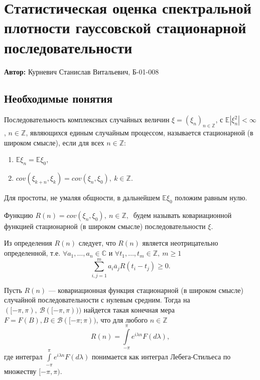 
					
\section{Статистическая оценка спектральной плотности гауссовской стационарной последовательности}

\textbf{Автор:} Курневич Станислав Витальевич, Б-01-008

\subsection*{Необходимые понятия}

\begin{definition}
	Последовательность комплексных случайных величин $\xi = (\xi_n)_{n \in \mathbb{Z}}$, с $\mathbb{E}|\xi_n^2| < \infty$, $n \in \mathbb{Z}$, являющихся единым случайным процессом, называется стационарной (в широком смысле), если для всех $n \in \mathbb{Z}$:
	\begin{enumerate}
		\item $\mathbb{E}  \xi_n = \mathbb{E} \xi_0,$
		\item $cov(\xi_{k+n}, \xi_k) = cov(\xi_n, \xi_0),~ k \in \mathbb{Z}.$
	\end{enumerate}
\end{definition}

Для простоты, не умаляя общности, в дальнейшем $\mathbb{E} \xi_0$ положим равным нулю.

\begin{definition}
	Функцию $R(n) = cov(\xi_n, \xi_0),~ n \in \mathbb{Z},~$ будем называть ковариационной функцией стационарной (в широком смысле) последовательности $\xi$.
\end{definition}

\begin{remark}
	Из определения $R(n)$ следует, что $R(n)$ является неотрицательно определенной, т.е. $\forall a_1, \dots, a_n \in \mathbb{C}$ и $\forall t_1, \dots, t_m \in \mathbb{Z},~ m \geq 1$
	\[\sum\limits_{i,j = 1}^{m}{a_i \overline{a}_j R(t_i - t_j)} \geq 0.\]
\end{remark}

\begin{theorem}
Пусть $R(n)$ --- ковариационная функция стационарной (в широком смысле) случайной последовательности с нулевым средним. Тогда на $([-\pi,\pi),~ \mathscr{B}([-\pi,\pi)))$ найдется такая конечная мера $F = F(B), B \in \mathscr{B}([-\pi;\pi))$, что для любого $n \in \mathbb{Z}$
\begin{equation}
	R(n) = \int\limits_{-\pi}^{\pi}e^{i\lambda n}F(d\lambda),
\end{equation}
где интеграл $\int\limits_{-\pi}^{\pi}{e^{i\lambda n}F(d\lambda)}$ понимается как интеграл Лебега-Стильеса по множеству $[-\pi,\pi).$
\end{theorem}

